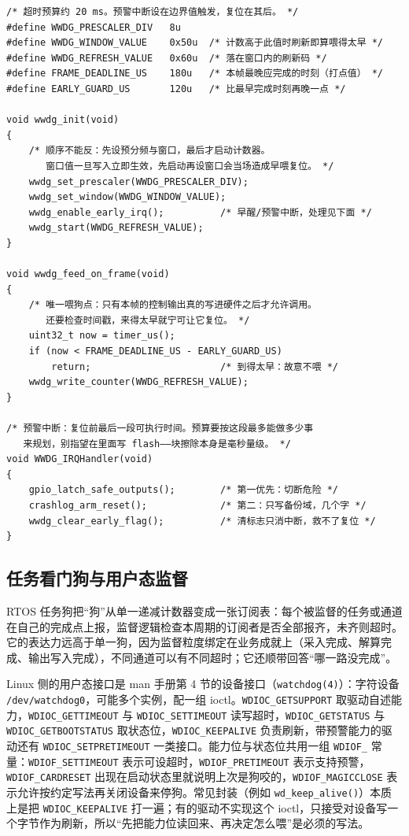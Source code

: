 \documentclass[12pt,a4paper,fontset=fandol]{ctexbook}
\newcommand{\Fn}[1]{\texttt{#1()}}
\newcommand{\Tp}[1]{\texttt{#1}}
\newcommand{\Bk}{\discretionary{}{}{}}
\newcommand{\Lang}[1]{\textsf{#1}}
\newcommand{\DomRtos}{\Lang{RTOS}}
\begin{document}
\begin{lstlisting}[style=cstyle,caption={C：窗口看门狗的喂狗与预警中断。这些 \Tp{wwdg\_} 前缀函数是本项目的薄封装，寄存器名以家族手册为准},label={lst:ch04-wwdg}]
/* 超时预算约 20 ms。预警中断设在边界值触发，复位在其后。 */
#define WWDG_PRESCALER_DIV   8u
#define WWDG_WINDOW_VALUE    0x50u  /* 计数高于此值时刷新即算喂得太早 */
#define WWDG_REFRESH_VALUE   0x60u  /* 落在窗口内的刷新码 */
#define FRAME_DEADLINE_US    180u   /* 本帧最晚应完成的时刻（打点值） */
#define EARLY_GUARD_US       120u   /* 比最早完成时刻再晚一点 */

void wwdg_init(void)
{
    /* 顺序不能反：先设预分频与窗口，最后才启动计数器。
       窗口值一旦写入立即生效，先启动再设窗口会当场造成早喂复位。 */
    wwdg_set_prescaler(WWDG_PRESCALER_DIV);
    wwdg_set_window(WWDG_WINDOW_VALUE);
    wwdg_enable_early_irq();          /* 早醒/预警中断，处理见下面 */
    wwdg_start(WWDG_REFRESH_VALUE);
}

void wwdg_feed_on_frame(void)
{
    /* 唯一喂狗点：只有本帧的控制输出真的写进硬件之后才允许调用。
       还要检查时间戳，来得太早就宁可让它复位。 */
    uint32_t now = timer_us();
    if (now < FRAME_DEADLINE_US - EARLY_GUARD_US)
        return;                       /* 到得太早：故意不喂 */
    wwdg_write_counter(WWDG_REFRESH_VALUE);
}

/* 预警中断：复位前最后一段可执行时间。预算要按这段最多能做多少事
   来规划，别指望在里面写 flash——块擦除本身是毫秒量级。 */
void WWDG_IRQHandler(void)
{
    gpio_latch_safe_outputs();        /* 第一优先：切断危险 */
    crashlog_arm_reset();             /* 第二：只写备份域，几个字 */
    wwdg_clear_early_flag();          /* 清标志只消中断，救不了复位 */
}
\end{lstlisting}

\subsection{任务看门狗与用户态监督}
\label{sec:ch04-taskwd}

\DomRtos{} 任务狗把``狗''从单一递减计数器变成一张订阅表：每个被监督的任务或通道在自己的完成点上报，监督逻辑检查本周期的订阅者是否全部报齐，未齐则超时。它的表达力远高于单一狗，因为监督粒度绑定在业务成就上（采入完成、解算完成、输出写入完成），不同通道可以有不同超时；它还顺带回答``哪一路没完成''。

Linux 侧的用户态接口是 man 手册第 4 节的设备接口（\Tp{watchdog(4)}）：字符设备 \Tp{/dev/watchdog0}，可能多个实例，配一组 ioctl。\Tp{WDIOC\_{\Bk}GETSUPPORT} 取驱动自述能力，\Tp{WDIOC\_{\Bk}GETTIMEOUT} 与 \Tp{WDIOC\_{\Bk}SETTIMEOUT} 读写超时，\Tp{WDIOC\_{\Bk}GETSTATUS} 与 \Tp{WDIOC\_{\Bk}GETBOOTSTATUS} 取状态位，\Tp{WDIOC\_{\Bk}KEEPALIVE} 负责刷新，带预警能力的驱动还有 \Tp{WDIOC\_{\Bk}SETPRETIMEOUT} 一类接口。能力位与状态位共用一组 \Tp{WDIOF\_} 常量：\Tp{WDIOF\_{\Bk}SETTIMEOUT} 表示可设超时，\Tp{WDIOF\_{\Bk}PRETIMEOUT} 表示支持预警，\Tp{WDIOF\_{\Bk}CARDRESET} 出现在启动状态里就说明上次是狗咬的，\Tp{WDIOF\_{\Bk}MAGICCLOSE} 表示允许按约定写法再关闭设备来停狗。常见封装（例如 \Fn{wd\_{\Bk}keep\_{\Bk}alive}）本质上是把 \Tp{WDIOC\_{\Bk}KEEPALIVE} 打一遍；有的驱动不实现这个 ioctl，只接受对设备写一个字节作为刷新，所以``先把能力位读回来、再决定怎么喂''是必须的写法。
\end{document}
